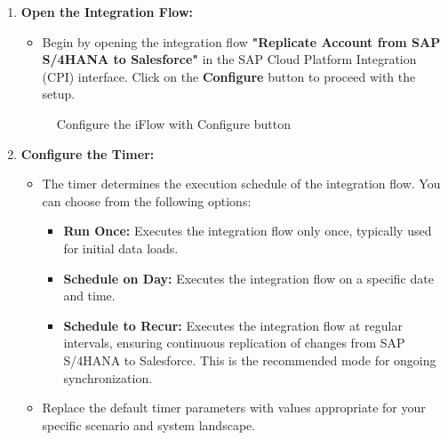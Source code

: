 \begin{enumerate}
    \item \textbf{Open the Integration Flow:}
    \begin{itemize}
        \item Begin by opening the integration flow \textbf{"Replicate Account from SAP S/4HANA to Salesforce"} in the SAP Cloud Platform Integration (CPI) interface. Click on the \textbf{Configure} button to proceed with the setup.
    \end{itemize}

    \begin{figure}[H]
    \centering
    \caption{Configure the iFlow with Configure button}
    
    \end{figure}

    \item \textbf{Configure the Timer:}
    \begin{itemize}
        \item The timer determines the execution schedule of the integration flow. You can choose from the following options:
        \begin{itemize}
            \item \textbf{Run Once:} Executes the integration flow only once, typically used for initial data loads.
            \item \textbf{Schedule on Day:} Executes the integration flow on a specific date and time.
            \item \textbf{Schedule to Recur:} Executes the integration flow at regular intervals, ensuring continuous replication of changes from SAP S/4HANA to Salesforce. This is the recommended mode for ongoing synchronization.
        \end{itemize}
        \item Replace the default timer parameters with values appropriate for your specific scenario and system landscape.
    \end{itemize}


\end{enumerate}
